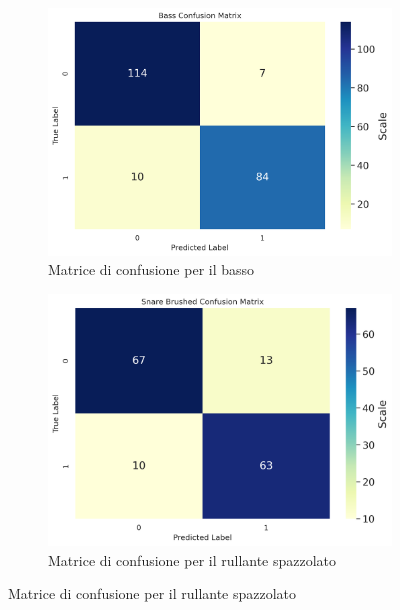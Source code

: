 \begin{figure}[h]
	\centering
	\begin{subfigure}{.5\linewidth}
		\includegraphics[width=\linewidth]{./immagini/first_classification/cb_cm.png} 
		\caption{Matrice di confusione per il basso}
		\label{fig:1a}
	\end{subfigure}\hfill
	\begin{subfigure}{.5\linewidth}
		\includegraphics[width=\linewidth]{./immagini/first_classification/sn_brushed_cm.png}
		\caption{Matrice di confusione per il rullante spazzolato}
		\label{fig:1b}
	\end{subfigure}
	

\end{figure}
